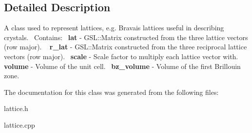 \subsection{Detailed Description}
A class used to represent lattices, e.\+g. Bravais lattices useful in describing crystals.~\newline
 Contains\+:~\newline
 {\bfseries lat} -\/ G\+S\+L\+::\+Matrix constructed from the three lattice vectors (row major). ~\newline
 {\bfseries r\+\_\+lat} -\/ G\+S\+L\+::\+Matrix constructed from the three reciprocal lattice vectors (row major).~\newline
 {\bfseries scale} -\/ Scale factor to multiply each lattice vector with.~\newline
 {\bfseries volume} -\/ Volume of the unit cell.~\newline
 {\bfseries bz\+\_\+volume} -\/ Volume of the first Brillouin zone.~\newline


The documentation for this class was generated from the following files\+:\begin{DoxyCompactItemize}
\item 
lattice.\+h\item 
lattice.\+cpp\end{DoxyCompactItemize}
